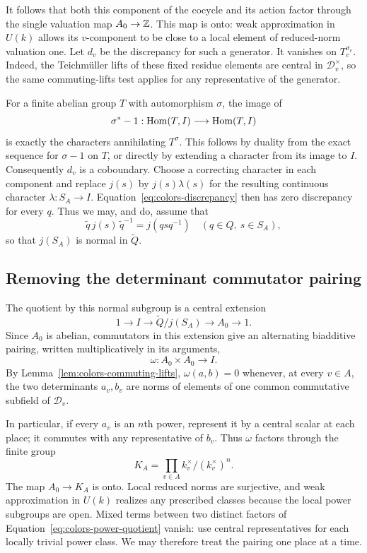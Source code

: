 It follows that both this component of the cocycle and its action factor
through the single valuation map $A_0\to\mathbb Z$.  This map is onto:
weak approximation in $U(k)$ allows its $v$-component to be close to
a local element of reduced-norm valuation one.  Let $d_v$ be the
discrepancy for such a generator.  It vanishes on $T_v^{\sigma_v}$.
Indeed, the Teichm\"uller lifts of these fixed residue elements are
central in $\mathcal D_v^\times$, so the same commuting-lifts test
applies for any representative of the generator.

For a finite abelian group $T$ with automorphism $\sigma$, the image of
\[
 \sigma^*-1:\operatorname{Hom}(T,I)\longrightarrow\operatorname{Hom}(T,I)
\]
is exactly the characters annihilating $T^\sigma$.  This follows by
duality from the exact sequence for $\sigma-1$ on $T$, or directly by
extending a character from its image to $I$.  Consequently $d_v$ is a
coboundary.  Choose a correcting character in each component and
replace $j(s)$ by $j(s)\lambda(s)$ for the resulting continuous character
$\lambda:S_A\to I$.  Equation~\eqref{eq:colors-discrepancy} then has
zero discrepancy for every $q$.  Thus we may, and do, assume that
\begin{equation}\label{eq:colors-equivariant-section}
 \widetilde q\,j(s)\,\widetilde q^{-1}=j(qsq^{-1})
 \quad(q\in Q,\ s\in S_A),
\end{equation}
so that $j(S_A)$ is normal in $\widetilde Q$.

\subsection{Removing the determinant commutator pairing}

The quotient by this normal subgroup is a central extension
\begin{equation}\label{eq:colors-determinant-extension}
 1\longrightarrow I\longrightarrow\widetilde Q/j(S_A)
 \longrightarrow A_0\longrightarrow1.
\end{equation}
Since $A_0$ is abelian, commutators in this extension give an alternating
biadditive pairing, written multiplicatively in its arguments,
\[
 \omega:A_0\times A_0\longrightarrow I.
\]
By Lemma~\ref{lem:colors-commuting-lifts}, $\omega(a,b)=0$ whenever,
at every $v\in A$, the two determinants $a_v,b_v$ are norms of elements
of one common commutative subfield of $\mathcal D_v$.

In particular, if every $a_v$ is an $n$th power, represent it by a
central scalar at each place; it commutes with any representative of
$b_v$.  Thus $\omega$ factors through the finite group
\begin{equation}\label{eq:colors-power-quotient}
 K_A=\prod_{v\in A}k_v^\times/(k_v^\times)^n.
\end{equation}
The map $A_0\to K_A$ is onto.  Local reduced norms are surjective, and
weak approximation in $U(k)$ realizes any prescribed classes because
the local power subgroups are open.  Mixed terms between two distinct
factors of Equation~\eqref{eq:colors-power-quotient} vanish: use central
representatives for each locally trivial power class.  We may therefore
treat the pairing one place at a time.

